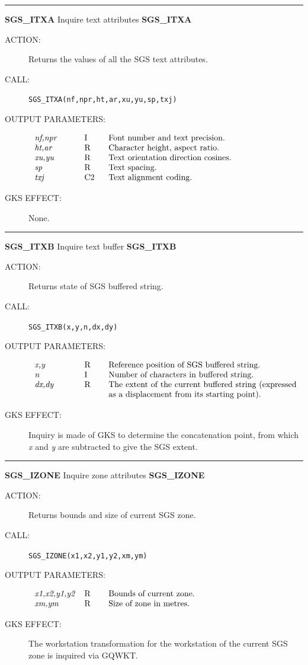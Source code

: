 \documentclass[11pt]{article}
\newcommand{\xlabel}[1]{}
\newcommand{\rthead}[2]{\rule{\textwidth}{0.3mm}
{\Large {\bf #1} \hfill #2 \hfill {\bf #1}}}
\newenvironment{params}%
{\[\begin{tabular}{p{0.14\textwidth}p{0.05\textwidth}p{0.66\textwidth}}}%
{\end{tabular}\]}
\newcommand{\rparams}[3]{{\em #1} &#2 &#3\\}
\newcommand{\rthead}[2]{\subsection{\label{#1}\xlabel{#1}#1 - #2}}
\newenvironment{params}{\begin{description}}{\end{description}}
\newcommand{\rparams}[3]{\item{{\em #1}} (#2) #3}
\begin{document}
\rthead{SGS\_ITXA}{Inquire text attributes}
\begin{description}
\item [ACTION:]
Returns the values of all the SGS text attributes.
\item [CALL:]
{\tt SGS\_ITXA(nf,npr,ht,ar,xu,yu,sp,txj)}
\item [OUTPUT PARAMETERS:]
\begin{params}
\rparams{nf,npr}{I}{Font number and text precision.}
\rparams{ht,ar}{R}{Character height, aspect ratio.}
\rparams{xu,yu}{R}{Text orientation direction cosines.}
\rparams{sp}{R}{Text spacing.}
\rparams{txj}{C2}{Text alignment coding.}
\end{params}
\item [GKS EFFECT:]
None.
\end{description}
\goodbreak

\rthead{SGS\_ITXB}{Inquire text buffer}
\begin{description}
\item [ACTION:]
Returns state of SGS buffered string.
\item [CALL:]
{\tt SGS\_ITXB(x,y,n,dx,dy)}
\item [OUTPUT PARAMETERS:]
\begin{params}
\rparams{x,y}{R}{Reference position of SGS buffered string.}
\rparams{n}{I}{Number of characters in buffered string.}
\rparams{dx,dy}{R}{The extent of the current buffered string (expressed as a
displacement from its starting point).}
\end{params}
\item [GKS EFFECT:]
Inquiry is made of GKS to determine the concatenation point, from
which {\em x}\/ and {\em y}\/ are subtracted to give the SGS extent.
\end{description}
\goodbreak

\rthead{SGS\_IZONE}{Inquire zone attributes}
\begin{description}
\item [ACTION:]
Returns bounds and size of current SGS zone.
\item [CALL:]
{\tt SGS\_IZONE(x1,x2,y1,y2,xm,ym)}
\item [OUTPUT PARAMETERS:]
\begin{params}
\rparams{x1,x2,y1,y2}{R}{Bounds of current zone.}
\rparams{xm,ym}{R}{Size of zone in metres.}
\end{params}
\item [GKS EFFECT:]
The workstation transformation for the workstation of the current SGS zone is
inquired via GQWKT.
\end{description}
\goodbreak
\end{document}
